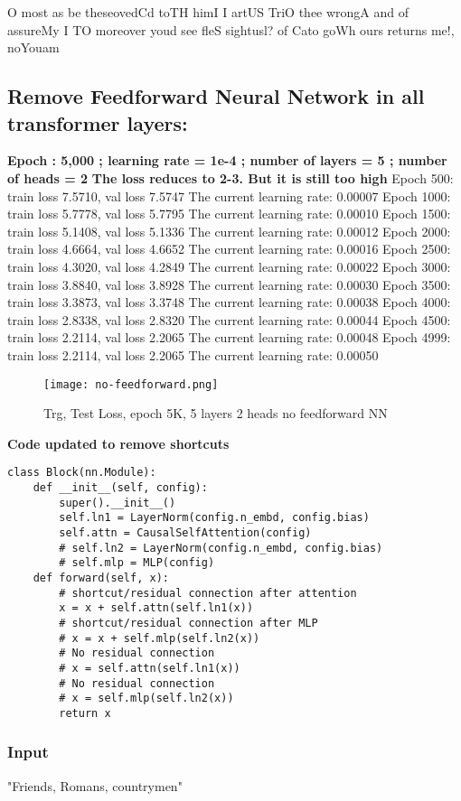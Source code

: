 \documentclass[conference]{IEEEtran}
\begin{document}
O most as
 be theseovedCd toTH himI I artUS TriO thee wrongA and of assureMy I TO moreover youd see fleS sightusl? of Cato goWh ours returns me!, noYouam

 \subsection{Remove Feedforward Neural Network in all transformer layers:}
 \textbf{Epoch : 5,000 ; learning rate = 1e-4 ; number of layers = 5 ; number of heads = 2}
 \textbf{The loss reduces to 2-3. But it is still too high}
 Epoch 500: train loss 7.5710, val loss 7.5747
The current learning rate: 0.00007
Epoch 1000: train loss 5.7778, val loss 5.7795
The current learning rate: 0.00010
Epoch 1500: train loss 5.1408, val loss 5.1336
The current learning rate: 0.00012
Epoch 2000: train loss 4.6664, val loss 4.6652
The current learning rate: 0.00016
Epoch 2500: train loss 4.3020, val loss 4.2849
The current learning rate: 0.00022
Epoch 3000: train loss 3.8840, val loss 3.8928
The current learning rate: 0.00030
Epoch 3500: train loss 3.3873, val loss 3.3748
The current learning rate: 0.00038
Epoch 4000: train loss 2.8338, val loss 2.8320
The current learning rate: 0.00044
Epoch 4500: train loss 2.2114, val loss 2.2065
The current learning rate: 0.00048
Epoch 4999: train loss 2.2114, val loss 2.2065
The current learning rate: 0.00050
\begin{figure}[H]
    \centering
    \texttt{[image: no-feedforward.png]}
    \caption{Trg, Test Loss, epoch 5K, 5 layers 2 heads no feedforward NN}
    \label{fig:epoch}
\end{figure}
\textbf{Code updated to remove shortcuts}
\begin{verbatim}
class Block(nn.Module):
    def __init__(self, config):
        super().__init__()
        self.ln1 = LayerNorm(config.n_embd, config.bias)
        self.attn = CausalSelfAttention(config)
        # self.ln2 = LayerNorm(config.n_embd, config.bias)
        # self.mlp = MLP(config)
    def forward(self, x):
        # shortcut/residual connection after attention
        x = x + self.attn(self.ln1(x)) 
        # shortcut/residual connection after MLP
        # x = x + self.mlp(self.ln2(x))
        # No residual connection
        # x = self.attn(self.ln1(x))   
        # No residual connection
        # x = self.mlp(self.ln2(x))    
        return x
\end{verbatim}

\subsubsection{Input}
"Friends, Romans, countrymen"
\end{document}
